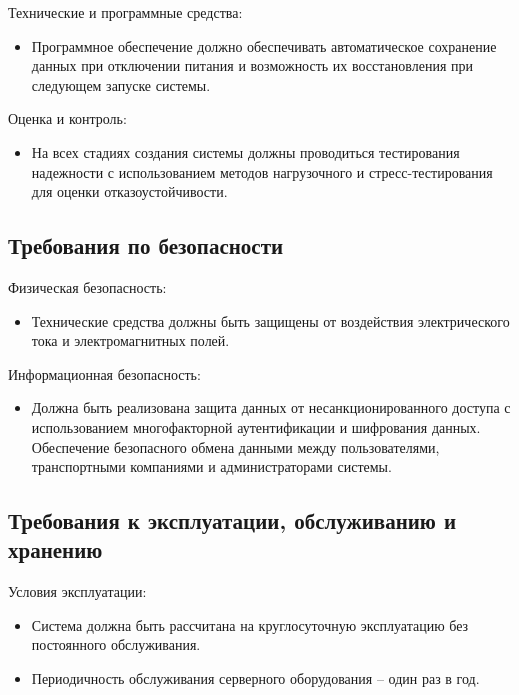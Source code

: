 \noindent Технические и программные средства:
\begin{itemize}
    \item Программное обеспечение должно обеспечивать автоматическое сохранение
    данных при отключении питания и возможность их восстановления при следующем
    запуске системы.
\end{itemize}

\noindent Оценка и контроль:
\begin{itemize}
    \item На всех стадиях создания системы должны проводиться тестирования
    надежности с использованием методов нагрузочного и стресс-тестирования для
    оценки отказоустойчивости.
\end{itemize}

\subsection{Требования по безопасности}

\noindent Физическая безопасность:
\begin{itemize}
    \item Технические средства должны быть защищены от воздействия
    электрического тока и электромагнитных полей.
\end{itemize}

\noindent Информационная безопасность:
\begin{itemize}
    \item Должна быть реализована защита данных от несанкционированного доступа
    с использованием многофакторной аутентификации и шифрования данных.
    Обеспечение безопасного обмена данными между пользователями, транспортными
    компаниями и администраторами системы.
\end{itemize}

\subsection{Требования к эксплуатации, обслуживанию и хранению}

\noindent Условия эксплуатации:
\begin{itemize}
    \item Система должна быть рассчитана на круглосуточную эксплуатацию без
    постоянного обслуживания.
    \item Периодичность обслуживания серверного оборудования -- один раз в год.
\end{itemize}

